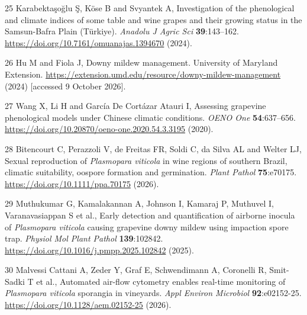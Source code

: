 \documentclass{article}
\begin{document}
25 Karabektaşoğlu Ş, Köse B and Svyantek A, Investigation of the phenological and climate indices of some table and wine grapes and their growing status in the Samsun-Bafra Plain (Türkiye). \emph{Anadolu J Agric Sci} \textbf{39}:143--162. \url{https://doi.org/10.7161/omuanajas.1394670} (2024).

26 Hu M and Fiola J, Downy mildew management. University of Maryland Extension. \url{https://extension.umd.edu/resource/downy-mildew-management} (2024) [accessed 9 October 2026].

27 Wang X, Li H and García De Cortázar Atauri I, Assessing grapevine phenological models under Chinese climatic conditions. \emph{OENO One} \textbf{54}:637--656. \url{https://doi.org/10.20870/oeno-one.2020.54.3.3195} (2020).

28 Bitencourt C, Perazzoli V, de Freitas FR, Soldi C, da Silva AL and Welter LJ, Sexual reproduction of \emph{Plasmopara viticola} in wine regions of southern Brazil, climatic suitability, oospore formation and germination. \emph{Plant Pathol} \textbf{75}:e70175. \url{https://doi.org/10.1111/ppa.70175} (2026).

29 Muthukumar G, Kamalakannan A, Johnson I, Kamaraj P, Muthuvel I, Varanavasiappan S et al., Early detection and quantification of airborne inocula of \emph{Plasmopara viticola} causing grapevine downy mildew using impaction spore trap. \emph{Physiol Mol Plant Pathol} \textbf{139}:102842. \url{https://doi.org/10.1016/j.pmpp.2025.102842} (2025).

30 Malvessi Cattani A, Zeder Y, Graf E, Schwendimann A, Coronelli R, Smit-Sadki T et al., Automated air-flow cytometry enables real-time monitoring of \emph{Plasmopara viticola} sporangia in vineyards. \emph{Appl Environ Microbiol} \textbf{92}:e02152-25. \url{https://doi.org/10.1128/aem.02152-25} (2026).
\end{document}
